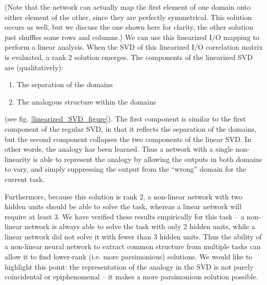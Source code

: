 \documentclass[10pt,letterpaper]{article}
\begin{document}
(Note that the network can actually map the first element of one domain onto either element of the other, since they are perfectly symmetrical. This solution occurs as well, but we discuss the one shown here for clarity, the other solution just shuffles some rows and columns.) We can use this linearized I/O mapping to perform a linear analysis. When the SVD of this linearized I/O correlation matrix is evaluated, a rank 2 solution emerges. The components of the linearized SVD are (qualitatively): \begin{enumerate}
\itemsep-0.25em
\item The separation of the domains
\item The analogous structure within the domains
\end{enumerate}
(see fig. \ref{linearized_SVD_figure}). The first component is similar to the first component of the regular SVD, in that it reflects the separation of the domains, but the second component collapses the two components of the linear SVD. In other words, the analogy has been learned. Thus a network with a single non-linearity is able to represent the analogy by allowing the outputs in both domains to vary, and simply suppressing the output from the ``wrong'' domain for the current task.\par
Furthermore, because this solution is rank 2, a non-linear network with two hidden units should be able to solve the task, whereas a linear network will require at least 3. We have verified these results empirically for this task -- a non-linear network is always able to solve the task with only 2 hidden units, while a linear network did not solve it with fewer than 3 hidden units. Thus the ability of a non-linear neural network to extract common structure from multiple tasks can allow it to find lower-rank (i.e. more parsimonious) solutions. We would like to highlight this point: the representation of the analogy in the SVD is not purely coincidental or epiphenomenal -- it makes a more parsimonious solution possible. \par
\end{document}

